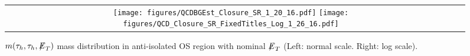 

 \begin{figure}[tbhp!]
      \centering
      \begin{tabular}{cc}
        \texttt{[image: figures/QCDBGEst\_Closure\_SR\_1\_20\_16.pdf]}
        \texttt{[image: figures/QCD\_Closure\_SR\_FixedTitles\_Log\_1\_26\_16.pdf]}
      \end{tabular}
     \caption{$m(\tau_{h},\tau_{h},{\not\mathrel{E}}_T)$ mass distribution in anti-isolated OS region with nominal ${\not\mathrel{E}}_T$ (Left: normal scale.  Right: log scale).}
    \label{fig:MG306}
 \end{figure}
 
